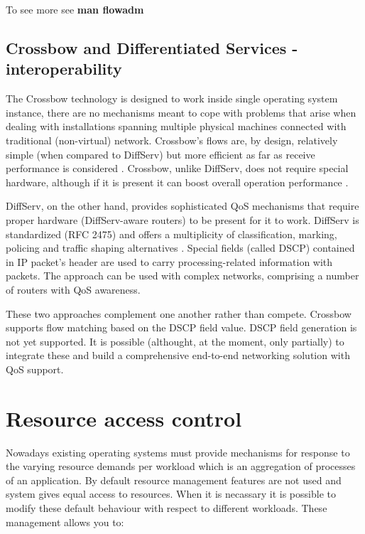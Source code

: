 \documentclass[11pt]{book}
\begin{document}
        To see more see \textbf{man flowadm}


      \subsection{Crossbow and Differentiated Services - interoperability}
      \label{sub:sol:diffserv}

        The Crossbow technology is designed to work inside single operating system instance, there are no mechanisms
        meant to cope with problems that arise when dealing with installations spanning multiple physical machines
        connected with traditional (non-virtual) network. Crossbow's flows are, by design, relatively simple (when
        compared to DiffServ) but more efficient as far as receive performance is considered \cite{xbow-vertically}.
        Crossbow, unlike DiffServ, does not require special hardware, although if it is present it can boost overall
        operation performance \cite{xbow-vertically}.

        DiffServ, on the other hand, provides sophisticated QoS mechanisms that require proper hardware (DiffServ-aware
        routers) to be present for it to work. DiffServ is standardized (RFC 2475) and offers a multiplicity of
        classification, marking, policing and traffic shaping alternatives \cite{rfc2475}. Special fields (called DSCP)
        contained in IP packet's header are used to carry processing-related information with packets. The approach can
        be used with complex networks, comprising a number of routers with QoS awareness.

        These two approaches complement one another rather than compete. Crossbow supports flow matching based on the
        DSCP field value. DSCP field generation is not yet supported. It is possible (althought, at the moment, only
        partially) to integrate these and build a comprehensive end-to-end networking solution with QoS support.


    \section{Resource access control}

      Nowadays existing operating systems must provide mechanisms for response to the varying resource demands
      per workload which is an aggregation of processes of an application. By default resource management
      features are not used and system gives equal access to resources. When it is necassary it is possible to
      modify these default behaviour with respect to different workloads. These management allows you to:
\end{document}
